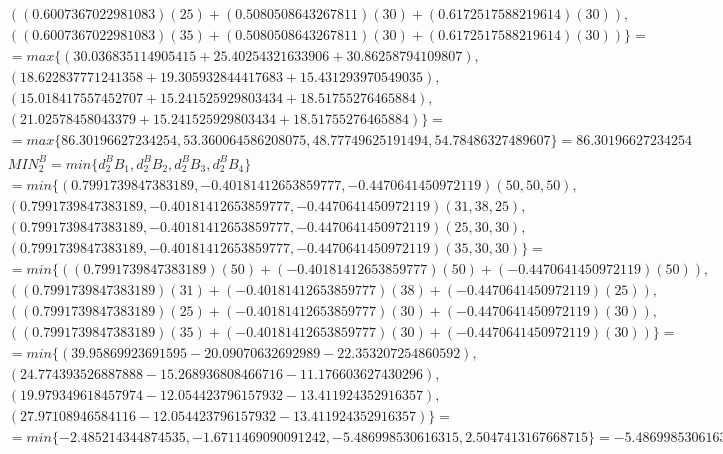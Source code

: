 \documentclass[a4paper]{article}
\begin{document}
\begin{align*}
		\\&((0.6007367022981083)(25) + (0.5080508643267811)(30) + (0.6172517588219614)(30)), 
		\\&((0.6007367022981083)(35) + (0.5080508643267811)(30) + (0.6172517588219614)(30))\}=
		\\
		&=max\{
		(30.036835114905415 + 25.40254321633906 + 30.86258794109807), 
		\\&(18.622837771241358 + 19.305932844417683 + 15.431293970549035), 
		\\&(15.018417557452707+ 15.241525929803434 + 18.51755276465884), 
		\\&(21.02578458043379 + 15.241525929803434 + 18.51755276465884)\}=
		\\&=max\{
		86.30196627234254, 
		53.360064586208075, 
		48.77749625191494, 
		54.78486327489607\} = 86.30196627234254
		\\
		&MIN_2^B = min\{d_2^B B_1, d_2^B B_2, d_2^B B_3, d_2^B B_4\} 
		\\
		&= min\{
		(0.7991739847383189, -0.40181412653859777, -0.4470641450972119) (50, 50, 50), 
		\\&(0.7991739847383189, -0.40181412653859777, -0.4470641450972119) (31, 38, 25), 
		\\&(0.7991739847383189, -0.40181412653859777, -0.4470641450972119) (25, 30, 30), 
		\\&(0.7991739847383189, -0.40181412653859777, -0.4470641450972119) (35, 30, 30)\}=
		\\
		&= min\{
		((0.7991739847383189)(50) + (-0.40181412653859777)(50) + (-0.4470641450972119)(50)), 
		\\&((0.7991739847383189)(31) + (-0.40181412653859777)(38) + (-0.4470641450972119)(25)), 
		\\&((0.7991739847383189)(25) + (-0.40181412653859777)(30) + (-0.4470641450972119)(30)), 
		\\&((0.7991739847383189)(35) + (-0.40181412653859777)(30) + (-0.4470641450972119)(30))\}=
		\\
		&=min\{
		(39.95869923691595 -20.09070632692989  -22.353207254860592), 
		\\&(24.774393526887888 -15.268936808466716 -11.176603627430296), 
		\\&(19.979349618457974 -12.054423796157932 -13.411924352916357), 
		\\&(27.97108946584116 -12.054423796157932 -13.411924352916357)\}=
		\\&=min\{
		-2.485214344874535, 
		-1.6711469090091242, 
		-5.486998530616315, 
		2.5047413167668715\} = -5.486998530616315
		\\
	\end{align*}
\end{document}

